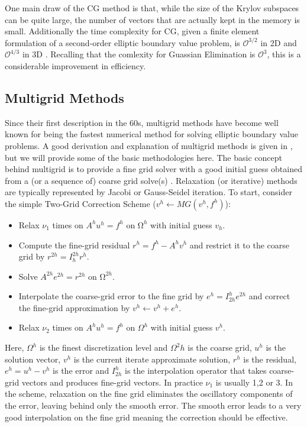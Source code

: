 \documentclass[]{article}
\begin{document}
One main draw of the CG method is that, while the size of the Krylov subspaces can be quite large, the number of vectors that are actually kept in the memory is small.  Additionally the time complexity for CG, given a finite element formulation of a second-order elliptic boundary value problem, is $\mathcal{O}^{3/2}$ in 2D and $\mathcal{O}^{4/3}$ in 3D \cite{Shewchuk1994}. Recalling that the comlexity for Guassian Elimination is $\mathcal{O}^{3}$, this is a considerable improvement in efficiency.

\subsection{Multigrid Methods}

Since their first description in the 60s, multigrid methods have become well known for being the fastest numerical method for solving elliptic boundary value problems.  A good derivation and explanation of multigrid methods is given in \cite{Briggs2000}, but we will provide some of the basic methodologies here. The basic concept behind multigrid is to provide a fine grid solver with a good initial guess obtained from a (or a sequence of) coarse grid solve(s) \cite{Briggs2000}.  Relaxation (or iterative) methods are typically represented by Jacobi or Gauss-Seidel iteration.  To start, consider the simple Two-Grid Correction Scheme ($v^h \leftarrow MG(v^h, f^h)$):
\begin{itemize}
\item Relax $\nu_1$ times on $A^h u^h = f^h$ on $Ω^h$ with initial guess $v_h$.
\item Compute the fine-grid residual $r^h = f^h - A^h v^h$ and restrict it to the coarse grid by $r^{2h} = I^{2h}_h r^h$.
\item Solve $A^{2h}e^{2h} = r^{2h}$ on $Ω^{2h}$.
\item Interpolate the coarse-grid error to the fine grid by $e^h = I^h_{2h} e^{2h}$ and correct the fine-grid approximation by $v^h \leftarrow v^h + e^h$.
\item Relax $\nu_2$ times on $A^h u^h = f^h$ on $\Omega^h$ with initial guess $v^h$.
\end{itemize}
Here, $\Omega^h$ is the finest discretization level and $\Omega^2h$ is the coarse grid, $u^h$ is the solution vector, $v^h$ is the current iterate approximate solution, $r^h$ is the residual, $e^h = u^h - v^h$ is the error and $I^h_{2h}$ is the interpolation operator that takes coarse-grid vectors and produces fine-grid vectors.  In practice $\nu_1$ is usually 1,2 or 3.  In the scheme, relaxation on the fine grid eliminates the oscillatory components of the error, leaving behind only the smooth error.  The smooth error leads to a very good interpolation on the fine grid meaning the correction should be effective. 
\end{document}
